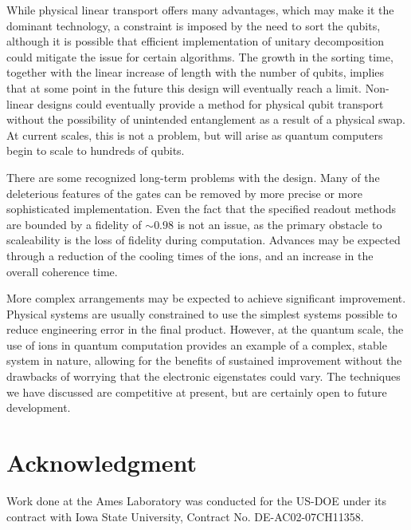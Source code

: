 \documentclass[12pt,a4paper]{amsart}
\numberwithin{equation}{section}
\theoremstyle{plain}
\theoremstyle{definition}
\begin{document}
While physical linear transport offers many advantages, which may make it the dominant technology, a constraint is imposed by the need to sort the qubits, although it is possible that efficient implementation of unitary decomposition could mitigate the issue for certain algorithms. The growth in the sorting time, together with the linear increase of length with the number of qubits, implies that at some point in the future this design will eventually reach a limit. Non-linear designs could eventually provide a method for physical qubit transport without the possibility of unintended entanglement as a result of a physical swap. At current scales, this is not a problem, but will arise as quantum computers begin to scale to hundreds of qubits.

There are some recognized long-term problems with the design. Many of the deleterious features of the gates can be removed by more precise or more sophisticated implementation. Even the fact that the specified readout methods are bounded by a fidelity of $\sim 0.98$ is not an issue, as the primary obstacle to scaleability is the loss of fidelity during computation. Advances may be expected through a reduction of the cooling times of the ions, and an increase in the overall coherence time.

More complex arrangements may be expected to achieve significant improvement. Physical systems are usually constrained to use the simplest systems possible to reduce engineering error in the final product. However, at the quantum scale, the use of ions in quantum computation provides an example of a complex, stable system in nature, allowing for the benefits of sustained improvement without the drawbacks of worrying that the electronic eigenstates could vary. The techniques we have discussed are competitive at present, but are certainly open to future development.


\section*{Acknowledgment}
  Work done at the Ames Laboratory was conducted for the US-DOE under its contract with Iowa State University, Contract No. DE-AC02-07CH11358.
\end{document}
